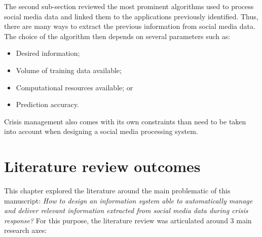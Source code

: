The second sub-section reviewed the most prominent algorithms used to process social media data and linked them to the applications previously identified.
Thus, there are many ways to extract the previous information from social media data.
The choice of the algorithm then depends on several parameters such as:

\begin{itemize}
    \item Desired information;
    \item Volume of training data available;
    \item Computational resources available; or
    \item Prediction accuracy.
\end{itemize}

Crisis management also comes with its own constraints than need to be taken into account when designing a social media processing system.

\section{Literature review outcomes}
This chapter explored the literature around the main problematic of this manuscript:
\emph{How to design an information system able to automatically manage and deliver relevant information extracted from social media data during crisis response?}
For this purpose, the literature review was articulated around 3 main research axes:


